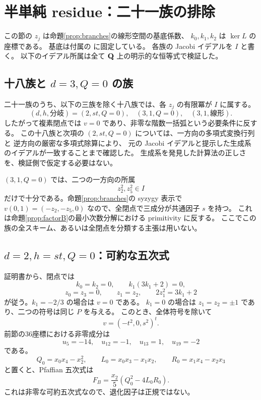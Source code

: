 \documentclass[11pt,a4paper]{ltjsarticle}
\theoremstyle{remark}\newtheorem{remark}[theorem]{注意}
\begin{document}
\section{半単純 residue：二十一族の排除}\label{sec:semisimple}

この節の $z_j$ は命題\ref{prop:branches}の線形空間の基底係数、
$k_0,k_1,k_2$ は $\ker L$ の座標である。
基底は付属の  に固定している。
各族の Jacobi イデアルを $I$ と書く。
以下のイデアル所属は全て $\mathbf Q$ 上の明示的な恒等式で検証した。

\subsection{十八族と \texorpdfstring{$d=3,Q=0$}{d=3, Q=0} の族}

二十一族のうち、以下の三族を除く十八族では、各 $z_j$ の有限冪が $I$ に属する。
\[
 (d,h,\text{分岐})=(2,st,Q=0),\quad(3,1,Q=0),\quad(3,1,\text{線形}).
\]
したがって複素閉点では $v=0$ であり、非零な階数一括弧という必要条件に反する。
この十八族と次項の $(2,st,Q=0)$ については、一方向の多項式変換行列と
逆方向の厳密な多項式除算により、
元の Jacobi イデアルと提示した生成系のイデアルが一致することまで確認した。
生成系を発見した計算法の正しさを、検証側で仮定する必要はない。

$(3,1,Q=0)$ では、二つの一方向の所属
\begin{equation}\label{eq:h-d3-q0}
                           z_2^2,z_5^2\in I
\end{equation}
だけで十分である。命題\ref{prop:branches}の syzygy 表示で
$v(0,1)=(-z_2,-z_5,0)$ なので、全閉点で三成分が共通因子 $s$ を持つ。
これは命題\ref{prop:factorB}の最小次数分解における primitivity に反する。
ここでこの族の全スキーム、あるいは全閉点を分類する主張は用いない。

\subsection{\texorpdfstring{$d=2,h=st,Q=0$}{d=2, h=st, Q=0}：可約な五次式}

証明書から、閉点では
\[
 k_0=k_2=0,\qquad k_1(3k_1+2)=0,
\]
\[
 z_0=z_3=0,\qquad z_1=z_2,\qquad 2z_1^2=3k_1+2
\]
が従う。$k_1=-2/3$ の場合は $v=0$ である。
$k_1=0$ の場合は $z_1=z_2=\pm1$ であり、二つの符号は同じ $P$ を与える。
このとき、全体符号を除いて
\[
                           v=(-t^2,0,s^2)^t.
\]
前節の36座標における非零成分は
\[
                 u_5=-14,\quad u_{12}=-1,\quad u_{13}=1,\quad u_{19}=-2
\]
である。
\[
 Q_0=x_0x_4-x_2^2,\qquad L_0=x_0x_3-x_1x_2,\qquad R_0=x_1x_4-x_2x_3
\]
と置くと、Pfaffian 五次式は
\begin{equation}\label{eq:h-reducible}
                     F_B=\frac{x_2}{5}(Q_0^2-4L_0R_0).
\end{equation}
これは非零な可約五次式なので、退化因子は正規ではない。
\end{document}
